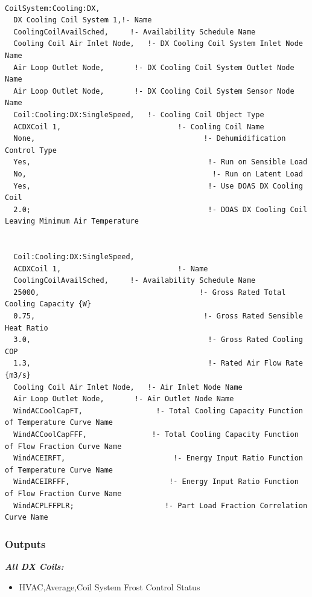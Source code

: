 \begin{lstlisting}

CoilSystem:Cooling:DX,
  DX Cooling Coil System 1,!- Name
  CoolingCoilAvailSched,     !- Availability Schedule Name
  Cooling Coil Air Inlet Node,   !- DX Cooling Coil System Inlet Node Name
  Air Loop Outlet Node,       !- DX Cooling Coil System Outlet Node Name
  Air Loop Outlet Node,       !- DX Cooling Coil System Sensor Node Name
  Coil:Cooling:DX:SingleSpeed,   !- Cooling Coil Object Type
  ACDXCoil 1,                           !- Cooling Coil Name
  None,                                       !- Dehumidification Control Type
  Yes,                                         !- Run on Sensible Load
  No,                                           !- Run on Latent Load
  Yes,                                         !- Use DOAS DX Cooling Coil
  2.0;                                         !- DOAS DX Cooling Coil Leaving Minimum Air Temperature


  Coil:Cooling:DX:SingleSpeed,
  ACDXCoil 1,                           !- Name
  CoolingCoilAvailSched,     !- Availability Schedule Name
  25000,                                     !- Gross Rated Total Cooling Capacity {W}
  0.75,                                       !- Gross Rated Sensible Heat Ratio
  3.0,                                         !- Gross Rated Cooling COP
  1.3,                                         !- Rated Air Flow Rate {m3/s}
  Cooling Coil Air Inlet Node,   !- Air Inlet Node Name
  Air Loop Outlet Node,       !- Air Outlet Node Name
  WindACCoolCapFT,                 !- Total Cooling Capacity Function of Temperature Curve Name
  WindACCoolCapFFF,               !- Total Cooling Capacity Function of Flow Fraction Curve Name
  WindACEIRFT,                         !- Energy Input Ratio Function of Temperature Curve Name
  WindACEIRFFF,                       !- Energy Input Ratio Function of Flow Fraction Curve Name
  WindACPLFFPLR;                     !- Part Load Fraction Correlation Curve Name
\end{lstlisting}

\subsubsection{Outputs}\label{outputs-19}

\textbf{\emph{All DX Coils:}}

\begin{itemize}
\tightlist
\item
  HVAC,Average,Coil System Frost Control Status
\end{itemize}

